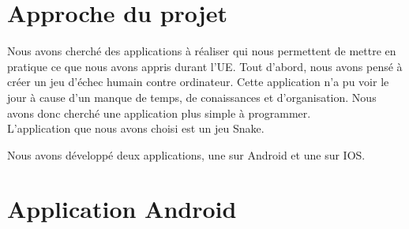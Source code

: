 \documentclass{article}
\begin{document}
\section{Approche du projet}
Nous avons cherché des applications à réaliser qui nous permettent de mettre en pratique ce que nous avons appris durant l'UE. Tout d'abord, nous avons pensé à créer un jeu d'échec humain contre ordinateur. Cette application n'a pu voir le jour à cause d'un manque de temps, de conaissances et d'organisation. Nous avons donc cherché une application plus simple à programmer.\\
L'application que nous avons choisi est un jeu Snake.

Nous avons développé deux applications, une sur Android et une sur IOS.

\section{Application Android}
\end{document}
